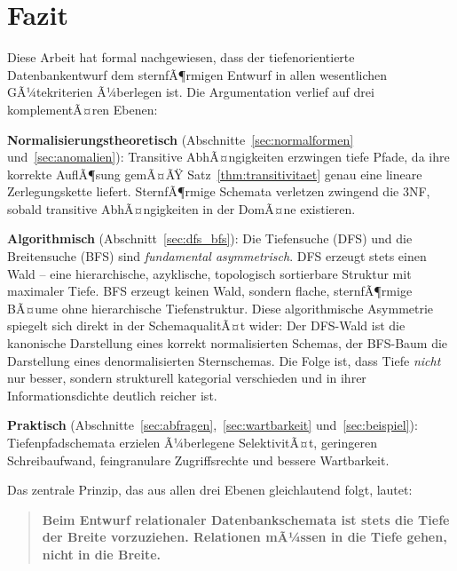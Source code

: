 ﻿\documentclass[12pt,a4paper]{article}
\theoremstyle{definition}
\theoremstyle{remark}
\begin{document}
\section{Fazit}
\label{sec:fazit}

Diese Arbeit hat formal nachgewiesen, dass der tiefenorientierte
Datenbankentwurf dem sternfÃ¶rmigen Entwurf in allen wesentlichen
GÃ¼tekriterien Ã¼berlegen ist. Die Argumentation verlief auf drei
komplementÃ¤ren Ebenen:

\textbf{Normalisierungstheoretisch} (Abschnitte~\ref{sec:normalformen}
und~\ref{sec:anomalien}): Transitive AbhÃ¤ngigkeiten erzwingen tiefe
Pfade, da ihre korrekte AuflÃ¶sung gemÃ¤ÃŸ Satz~\ref{thm:transitivitaet}
genau eine lineare Zerlegungskette liefert. SternfÃ¶rmige Schemata
verletzen zwingend die 3NF, sobald transitive AbhÃ¤ngigkeiten in der
DomÃ¤ne existieren.

\textbf{Algorithmisch} (Abschnitt~\ref{sec:dfs_bfs}): Die Tiefensuche
(DFS) und die Breitensuche (BFS) sind \emph{fundamental asymmetrisch}.
DFS erzeugt stets einen Wald -- eine hierarchische, azyklische,
topologisch sortierbare Struktur mit maximaler Tiefe. BFS erzeugt
keinen Wald, sondern flache, sternfÃ¶rmige BÃ¤ume ohne hierarchische
Tiefenstruktur. Diese algorithmische Asymmetrie spiegelt sich direkt
in der SchemaqualitÃ¤t wider: Der DFS-Wald ist die kanonische Darstellung
eines korrekt normalisierten Schemas, der BFS-Baum die Darstellung
eines denormalisierten Sternschemas. Die Folge ist, dass Tiefe \emph{nicht}
nur besser, sondern strukturell kategorial verschieden und
in ihrer Informationsdichte deutlich reicher ist.

\textbf{Praktisch} (Abschnitte~\ref{sec:abfragen},~\ref{sec:wartbarkeit}
und~\ref{sec:beispiel}): Tiefenpfadschemata erzielen Ã¼berlegene
SelektivitÃ¤t, geringeren Schreibaufwand, feingranulare Zugriffsrechte
und bessere Wartbarkeit.

Das zentrale Prinzip, das aus allen drei Ebenen gleichlautend folgt, lautet:

\begin{quote}
\large\bfseries
Beim Entwurf relationaler Datenbankschemata ist stets die Tiefe der
Breite vorzuziehen. Relationen mÃ¼ssen in die Tiefe gehen, nicht in
die Breite.
\end{quote}
\end{document}

